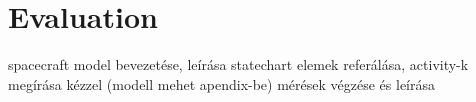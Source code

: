 \chapter{Evaluation}\label{ch:evaluation}

spacecraft model bevezetése, leírása
statechart elemek referálása, activity-k megírása kézzel (modell mehet apendix-be)
mérések végzése és leírása

\begin{figure}[!ht]
	\centering
	
	\caption{}
	\label{}
\end{figure}

\begin{figure}[!ht]
\centering

\caption{}
\label{}
\end{figure}

\begin{figure}[!ht]
\centering

\caption{}
\label{}
\end{figure}

\begin{figure}[!ht]
\centering

\caption{}
\label{}
\end{figure}

\begin{figure}[!ht]
\centering

\caption{}
\label{}
\end{figure}

\begin{figure}[!ht]
\centering

\caption{}
\label{}
\end{figure}